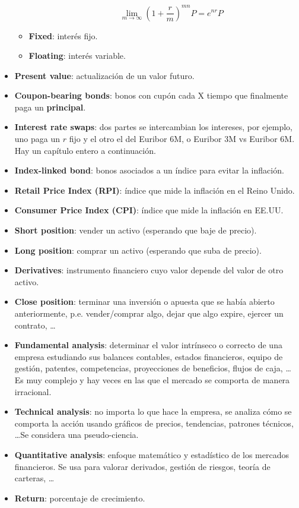 \begin{itemize}
\begin{itemize}
\begin{itemize}
            \[\lim_{m\rightarrow\infty}\left(1+\frac{r}{m}\right)^{mn}P=e^{nr}P\]
        \end{itemize}
        \item \textbf{Fixed}: interés fijo.
        \item \textbf{Floating}: interés variable.
    \end{itemize}
    \item \textbf{Present value}: actualización de un valor futuro. 
    \item \textbf{Coupon-bearing bonds}: bonos con cupón cada X tiempo que finalmente paga un \textbf{principal}.
    \item \textbf{Interest rate swaps}: dos partes se intercambian los intereses, por ejemplo, uno paga un $r$ fijo y el otro el del Euribor 6M, o Euribor 3M vs Euribor 6M. Hay un capítulo entero a continuación.
    \item \textbf{Index-linked bond}: bonos asociados a un índice para evitar la inflación.
    \item \textbf{Retail Price Index (RPI)}: índice que mide la inflación en el Reino Unido.
    \item \textbf{Consumer Price Index (CPI)}: índice que mide la inflación en EE.UU.\@
    \item \textbf{Short position}: vender un activo (esperando que baje de precio).
    \item \textbf{Long position}: comprar un activo (esperando que suba de precio).
    \item \textbf{Derivatives}: instrumento financiero cuyo valor depende del valor de otro activo.
    \item \textbf{Close position}: terminar una inversión o apuesta que se había abierto anteriormente, p.e. vender/comprar algo, dejar que algo expire, ejercer un contrato, \ldots{}
    \item \textbf{Fundamental analysis}: determinar el valor intrínseco o correcto de una empresa estudiando sus balances contables, estados financieros, equipo de gestión, patentes, competencias, proyecciones de beneficios, flujos de caja, \dots Es muy complejo y hay veces en las que el mercado se comporta de manera irracional.
    \item \textbf{Technical analysis}: no importa lo que hace la empresa, se analiza cómo se comporta la acción usando gráficos de precios, tendencias, patrones técnicos, \dots Se considera una pseudo-ciencia.
    \item \textbf{Quantitative analysis}: enfoque matemático y estadístico de los mercados financieros. Se usa para valorar derivados, gestión de riesgos, teoría de carteras, \dots
    \item \textbf{Return}: porcentaje de crecimiento.
\end{itemize}


